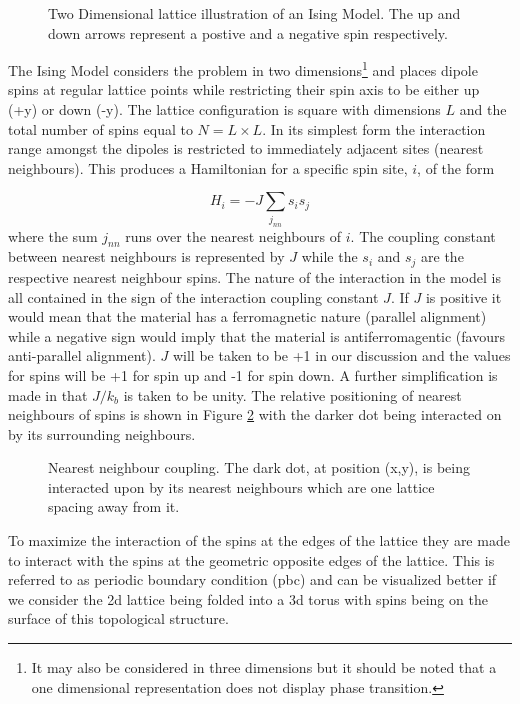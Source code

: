 \documentclass[a4paper]{article}
\begin{document}
\begin{figure}[htb]
  \centering
  \caption{Two Dimensional lattice illustration of an Ising Model. The up and down arrows represent a postive and a negative spin respectively.  }\label{fig:isinglat}
\end{figure}
The Ising Model considers the problem in two 
dimensions\footnote{It may also be considered in three dimensions but
  it should be noted that a one dimensional representation does not
  display phase transition.} and places dipole spins at regular
lattice points while restricting their spin axis to
be either up (+y) or down (-y). The lattice configuration is square
with dimensions $L$ and the total number of spins equal to $N=L\times L$. In its simplest form the interaction
range amongst the dipoles is restricted to immediately adjacent
sites (nearest neighbours). This produces a Hamiltonian for a specific
spin site, $i$, of the form 

\begin{equation}
H_i=-J \sum_{j_{nn}} s_i s_j\label{eq:ham}
\end{equation}
where the sum $j_{nn}$ runs over the nearest neighbours of $i$.
The coupling constant between nearest neighbours is represented by 
$J$ while the $s_i$  and $s_j$ are the respective nearest neighbour
spins.  The nature of the interaction in the model is all contained in the
sign of the interaction coupling 
constant $J$. If $J$ is positive it would mean that the material has a
ferromagnetic nature (parallel alignment) while a negative sign would
imply that the material is antiferromagentic (favours anti-parallel
alignment). $J$ will be taken to be +1 in our discussion and the values for spins
will be +1 for spin up and -1 for spin down. A further simplification
is made in that $J/k_b$ is taken to be unity. The relative positioning
of nearest neighbours of spins is shown in Figure \ref{fig:Jnn} with the
darker dot being interacted on by its surrounding neighbours. 

\begin{figure}[htb]
  \centering
  \caption{Nearest neighbour coupling. The dark dot, at position (x,y), is being interacted upon by its nearest neighbours which are one lattice spacing away from it.}\label{fig:Jnn}
\end{figure}
To maximize the interaction of the spins at the edges of the lattice
they are made to interact with the spins at the geometric opposite edges
of the lattice. This is referred to as periodic boundary 
condition (pbc) and can be visualized better if we consider the 2d
lattice being folded into a 3d torus with spins being on the surface
of this topological structure. 
\end{document}
